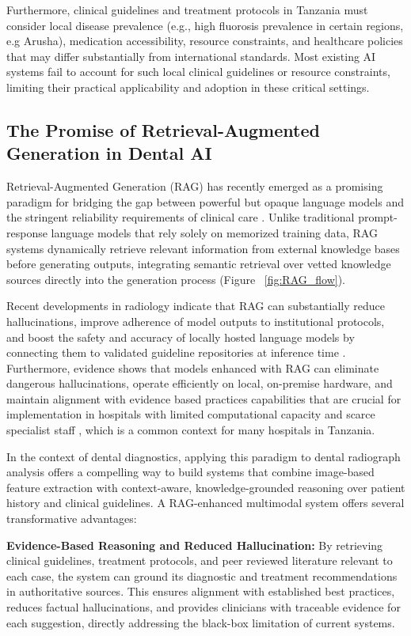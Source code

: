 \documentclass[12pt,a4paper]{report}
\begin{document}
	Furthermore, clinical guidelines and treatment protocols in Tanzania must consider local disease prevalence (e.g., high fluorosis prevalence in certain regions, e.g Arusha), medication accessibility, resource constraints, and healthcare policies that may differ substantially from international standards. Most existing AI systems fail to account for such local clinical guidelines or resource constraints, limiting their practical applicability and adoption in these critical settings.
	
	\subsection{The Promise of Retrieval-Augmented Generation in Dental AI}
	
	Retrieval-Augmented Generation (RAG) has recently emerged as a promising paradigm for bridging the gap between powerful but opaque language models and the stringent reliability requirements of clinical care \cite{lewis2020retrieval}. Unlike traditional prompt-response language models that rely solely on memorized training data, RAG systems dynamically retrieve relevant information from external knowledge bases before generating outputs, integrating semantic retrieval over vetted knowledge sources directly into the generation process (Figure ~\ref{fig:RAG_flow}).
	
	Recent developments in radiology indicate that RAG can substantially reduce hallucinations, improve adherence of model outputs to institutional protocols, and boost the safety and accuracy of locally hosted language models by connecting them to validated guideline repositories at inference time \cite{Wada2025RAGRadiology}. Furthermore, evidence shows that models enhanced with RAG can eliminate dangerous hallucinations, operate efficiently on local, on-premise hardware, and maintain alignment with evidence based practices capabilities that are crucial for implementation in hospitals with limited computational capacity and scarce specialist staff \cite{Wada2025RAGRadiology}, which is a common context for many hospitals in Tanzania.
	
	In the context of dental diagnostics, applying this paradigm to dental radiograph analysis offers a compelling way to build systems that combine image-based feature extraction with context-aware, knowledge-grounded reasoning over patient history and clinical guidelines. A RAG-enhanced multimodal system offers several transformative advantages:
	
	\textbf{Evidence-Based Reasoning and Reduced Hallucination:} By retrieving clinical guidelines, treatment protocols, and peer reviewed literature relevant to each case, the system can ground its diagnostic and treatment recommendations in authoritative sources. This ensures alignment with established best practices, reduces factual hallucinations, and provides clinicians with traceable evidence for each suggestion, directly addressing the black-box limitation of current systems.
	
\end{document}
